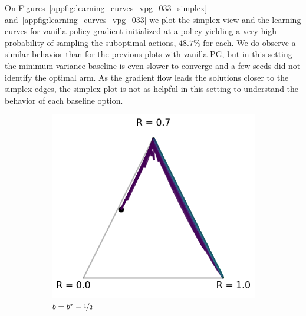 On Figures~\ref{appfig:learning_curves_vpg_033_simplex} and~\ref{appfig:learning_curves_vpg_033} we plot the simplex view and the learning curves for vanilla policy gradient initialized at a policy yielding a very high probability of sampling the suboptimal actions, $48.7 \%$ for each. We do observe a similar behavior than for the previous plots with vanilla PG, but in this setting the minimum variance baseline is even slower to converge and a few seeds did not identify the optimal arm. As the gradient flow leads the solutions closer to the simplex edges, the simplex plot is not as helpful in this setting to understand the behavior of each baseline option.

\begin{figure}[!ht]
\centering
  \begin{subfigure}[b]{0.245\linewidth}
    \includegraphics[width=\textwidth]{articles/baselines/figs/appendix_figs_3arm_033/vanilla_minvar_-05.png}
    \caption{$b = b^\ast - \nicefrac{1}{2}$}
  \end{subfigure}
    \begin{subfigure}[b]{0.245\linewidth}

\end{subfigure}
\end{figure}
